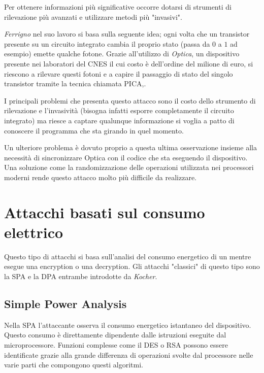 		Per ottenere informazioni più significative occorre dotarsi di strumenti di rilevazione più avanzati e utilizzare metodi più "invasivi".
		
		\emph{Ferrigno} nel suo lavoro\cite{ferrigno2008aes} si basa sulla seguente idea; ogni volta che un transistor presente su un circuito integrato cambia il proprio stato (passa da $0$ a $1$ ad esempio) emette qualche fotone. Grazie all'utilizzo di \emph{Optica}, un dispositivo presente nei laboratori del \ac{CNES} il cui costo è dell'ordine del milione di euro, si riescono a rilevare questi fotoni e a capire il passaggio di stato del singolo transistor tramite la tecnica chiamata \ac{PICA}\cite{tsang2000picosecond},.
		
		I principali problemi che presenta questo attacco sono il costo dello strumento di rilevazione e l'invasività (bisogna infatti esporre completamente il circuito integrato) ma riesce a captare qualunque informazione si voglia a patto di conoscere il programma che sta girando in quel momento.
		
		Un ulteriore problema è dovuto proprio a questa ultima osservazione insieme alla necessità di sincronizzare Optica con il codice che sta eseguendo il dispositivo. Una soluzione come la randomizzazione delle operazioni utilizzata nei processori moderni rende questo attacco molto più difficile da realizzare.
			
	\section{Attacchi basati sul consumo elettrico}
		Questo tipo di attacchi si basa sull'analisi del consumo energetico di un \disps mentre esegue una encryption o una decryption. Gli attacchi "classici" di questo tipo sono la \ac{SPA} e la \ac{DPA} entrambe introdotte da \emph{Kocher}\cite{kocher2011introduction}.
		
		\subsection{Simple Power Analysis}
		Nella \ac{SPA} l'attaccante osserva il consumo energetico istantaneo del dispositivo. Questo consumo è direttamente dipendente dalle istruzioni eseguite dal microprocessore. Funzioni complesse come il \ac{DES} o RSA possono essere identificate grazie alla grande differenza di operazioni svolte dal processore nelle varie parti che compongono questi algoritmi. 
		
